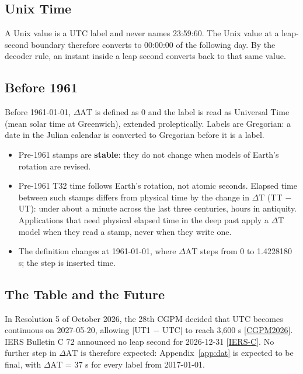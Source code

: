 \documentclass[11pt]{article}
\newcommand{\dAT}{\ensuremath{\Delta\mathrm{AT}}}
\newcommand{\App}[1]{Appendix~\ref{#1}}
\newcommand{\xref}[1]{[\hyperref[ref:#1]{#1}]}
\begin{document}
\subsection{Unix Time}

A Unix value is a UTC label and never names 23:59:60. The Unix value at a
leap-second boundary therefore converts to 00:00:00 of the following day. By
the decoder rule, an instant inside a leap second converts back to that same
value.

\subsection{Before 1961}\label{sec:before1961}

Before 1961-01-01, \dAT{} is defined as 0 and the label is read as Universal
Time (mean solar time at Greenwich), extended proleptically. Labels are
Gregorian: a date in the Julian calendar is converted to Gregorian before it is
a label.

\begin{itemize}
\item Pre-1961 stamps are \textbf{stable}: they do not change when models of
Earth's rotation are revised.
\item Pre-1961 T32 time follows Earth's rotation, not atomic seconds. Elapsed
time between such stamps differs from physical time by the change in
$\Delta$T (TT $-$ UT): under about a minute across the last three centuries,
hours in antiquity. Applications that need physical elapsed time in the deep
past apply a $\Delta$T model when they read a stamp, never when they write
one.
\item The definition changes at 1961-01-01, where \dAT{} steps from 0 to
1.4228180 s; the step is inserted time.
\end{itemize}

\subsection{The Table and the Future}\label{sec:future}

In Resolution 5 of October 2026, the 28th CGPM decided that UTC becomes
continuous on 2027-05-20, allowing $|$UT1 $-$ UTC$|$ to reach 3,600 s
\xref{CGPM2026}. IERS
Bulletin C 72 announced no leap second for 2026-12-31 \xref{IERS-C}. No
further step in \dAT{} is therefore expected: \App{app:dat} is expected to be
final, with \dAT{} = 37 s for every label from 2017-01-01.
\end{document}
